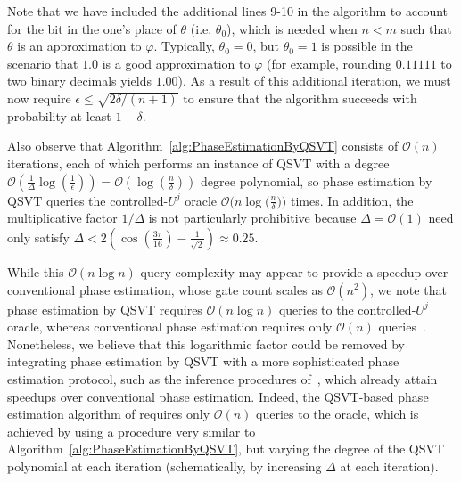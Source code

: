 \documentclass[aps,pra,showpacs,notitlepage,twocolumn,superscriptaddress,nofootinbib]{revtex4-1}
\begin{document}
    Note that we have included the additional lines 9-10 in the algorithm to account for the bit in the one's place of $\theta$ (i.e. $\theta_0$), which is needed when $n<m$ such that $\theta$ is an approximation to $\varphi$. Typically, $\theta_0 = 0$, but $\theta_0=1$ is possible in the scenario that $1.0$ is a good approximation to $\varphi$ (for example, rounding $0.11111$ to two binary decimals yields $1.00$). As a result of this additional iteration, we must now require $\epsilon \leq \sqrt{2\delta/(n+1)}$ to ensure that the algorithm succeeds with probability at least $1-\delta$. 


    Also observe that Algorithm~\ref{alg:PhaseEstimationByQSVT} consists of $\mathcal{O}(n)$ iterations, each of which performs an instance of QSVT with a degree $\mathcal{O}\left( \frac{1}{\Delta} \log(\frac{1}{\epsilon} ) \right) = \mathcal{O}\left( \log(\frac{n}{\delta}) \right)$ degree polynomial, so phase estimation by QSVT queries the controlled-$U^j$ oracle $\mathcal{O}\big(n \log \big( \frac{n}{\delta} \big) \big)$ times. In addition, the multiplicative factor $1/\Delta$ is not particularly prohibitive because $\Delta = \mathcal{O}(1)$ need only satisfy $\Delta < 2\left(\cos(\frac{3\pi}{16}) - \frac{1}{\sqrt{2}} \right) \approx 0.25$. 
    
        
    While this $\mathcal{O}(n\log n)$ query complexity may appear to provide a speedup over conventional phase estimation, whose gate count scales as $\mathcal{O}(n^2)$, we note that phase estimation by QSVT requires $\mathcal{O}(n \log n)$ queries to the controlled-$U^j$ oracle, whereas conventional phase estimation requires only $\mathcal{O}(n)$ queries~\cite{nielsen2010quantum}. Nonetheless, we believe that this logarithmic factor could be removed by integrating phase estimation by QSVT with a more sophisticated phase estimation protocol, such as the inference procedures of~\cite{svore2013faster, Wiebe_2016}, which already attain speedups over conventional phase estimation. Indeed, the QSVT-based phase estimation algorithm of \cite{rall2021faster} requires only $\mathcal{O}(n)$ queries to the oracle, which is achieved by using a procedure very similar to Algorithm~\ref{alg:PhaseEstimationByQSVT}, but varying the degree of the QSVT polynomial at each iteration (schematically, by increasing $\Delta$ at each iteration). 
    
\end{document}
